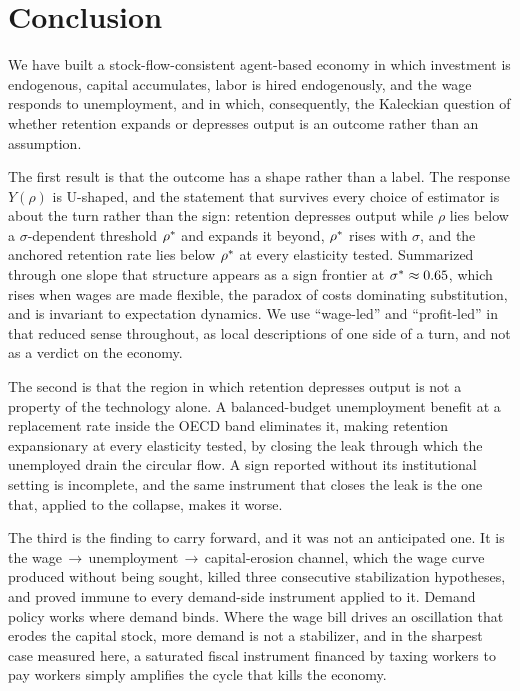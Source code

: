 
\section{Conclusion}
\label{sec:conclusion}

We have built a stock-flow-consistent agent-based economy in which investment
is endogenous, capital accumulates, labor is hired endogenously, and the wage
responds to unemployment, and in which, consequently, the Kaleckian question
of whether retention expands or depresses output is an outcome rather than an
assumption.

The first result is that the outcome has a shape rather than a label. The
response $Y(\rho)$ is U-shaped, and the statement that survives every choice of
estimator is about the turn rather than the sign: retention depresses
output while $\rho$ lies below a $\sigma$-dependent threshold $\rho^{\ast}$ and
expands it beyond, $\rho^{\ast}$ rises with $\sigma$, and the anchored retention
rate lies below $\rho^{\ast}$ at every elasticity tested. Summarized
through one slope that structure appears as a sign frontier at $\sigma^{\ast}
\approx 0.65$, which rises when wages are made flexible, the paradox of costs
dominating substitution, and is invariant to expectation dynamics. We use
``wage-led'' and ``profit-led'' in that reduced sense throughout, as local
descriptions of one side of a turn, and not as a verdict on the economy.

The second is that the region in which retention depresses output is not a
property of the technology alone. A balanced-budget unemployment benefit at a
replacement rate inside the OECD band eliminates it, making retention
expansionary at every elasticity tested, by closing the leak through which the
unemployed drain the circular flow. A sign reported without its institutional
setting is incomplete, and the same instrument that closes the leak is the one
that, applied to the collapse, makes it worse.

The third is the finding to carry forward, and it was not an anticipated one. It
is the wage$\,\to\,$unemployment$\,\to\,$capital-erosion channel, which the wage
curve produced without being sought, killed three consecutive stabilization
hypotheses, and proved immune to every demand-side instrument applied to it.
Demand policy works where demand binds. Where the wage bill drives an
oscillation that erodes the capital stock, more demand is not a stabilizer,
and in the sharpest case measured here, a saturated fiscal instrument financed
by taxing workers to pay workers simply amplifies the cycle that kills the
economy.

